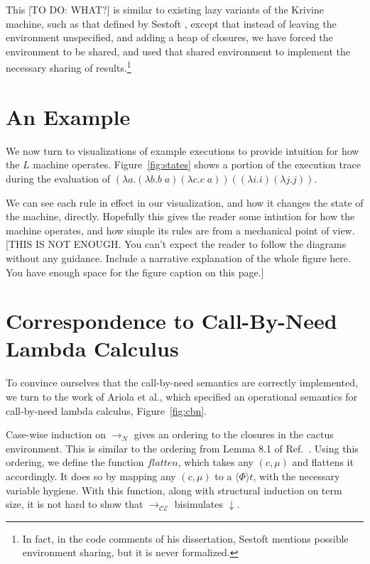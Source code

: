 \documentclass[preprint]{sigplanconf}
\begin{document}
This [TO DO: WHAT?] is similar to existing lazy variants of the Krivine machine, such as that
defined by Sestoft \cite{sestoft}, except that instead of leaving the
environment unspecified, and adding a heap of closures, we have forced the
environment to be shared, and used that shared environment to implement the
necessary sharing of results.\footnote{In fact, in the code comments of his
dissertation, Sestoft mentions possible environment sharing, but it is never
formalized.} 

\section{An Example}

We now turn to 
visualizations of example executions to provide intuition for how the $L$
machine operates. Figure~\ref{fig:states} shows a portion
of the execution trace during the evaluation of $(\lambda a.(\lambda b.b \; a)
(\lambda c.c \; a)) ((\lambda i.i) (\lambda j.j))$. 



We can see each rule in effect in our visualization, and how it changes the
state of the machine, directly. Hopefully this gives the reader some intiution
for how the machine operates, and how simple its rules are from a mechanical
point of view. [THIS IS NOT ENOUGH. You can't expect the reader to follow the diagrams
without any guidance. Include a narrative explanation of the whole figure here. You have enough
space for the figure caption on this page.]

\section{Correspondence to Call-By-Need Lambda Calculus}
To convince ourselves that the call-by-need
semantics are correctly implemented, we turn to the work of
Ariola et al.\cite{ariola1995call}, which specified an operational semantics for
call-by-need lambda calculus, Figure~\ref{fig:cbn}.



Case-wise induction on $\rightarrow_{N}$ gives an ordering to the closures
in the cactus environment. This is similar to the ordering from Lemma 8.1 of
Ref.~\cite{ariola1995call}.
Using this ordering, we define the function $flatten$, which takes any $(c, \mu)$
and flattens it accordingly. It does so by mapping any $(c, \mu)$ to a $\langle
\Phi \rangle t$, with the necessary variable hygiene. With this function, along
with structural induction on term size, it is not hard to show that
$\rightarrow_{\mathcal{CE}}$ bisimulates $\downarrow$.
\end{document}
